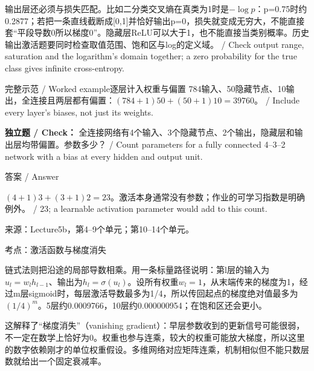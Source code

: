 输出层还必须与损失匹配。比如二分类交叉熵在真类为1时是\(-\log p\)：p=0.75时约0.2877；若把一条直线截断成[0,1]并恰好输出p=0，损失就变成无穷大，不能直接套“平段导数0所以梯度0”。隐藏层ReLU可以大于1，也不能直接当类别概率。历史输出激活题要同时检查取值范围、饱和区与log的定义域。 / Check output range, saturation and the logarithm's domain together; a zero probability for the true class gives infinite cross-entropy.


\begin{StudyBlock}{完整示范 / Worked example}{逐层计入权重与偏置}
784输入、50隐藏节点、10输出，全连接且两层都有偏置：\((784+1)50+(50+1)10=39760\)。 / Include every layer's biases, not just its weights.
\end{StudyBlock}


\textbf{独立题 / Check：} 全连接网络有4个输入、3个隐藏节点、2个输出，隐藏层和输出层均带偏置。参数多少？ / Count parameters for a fully connected 4–3–2 network with a bias at every hidden and output unit.



\begin{StudySolution}{答案 / Answer}


\((4+1)3+(3+1)2=23\)。激活本身通常没有参数；作业的可学习指数是明确例外。 / 23; a learnable activation parameter would add to this count.


\end{StudySolution}


来源：Lecture5b，第4–9个单元；第10–14个单元。








考点：激活函数与梯度消失
 

链式法则把沿途的局部导数相乘。用一条标量路径说明：第l层的输入为\(u_l=w_lh_{l-1}\)、输出为\(h_l=\sigma(u_l)\)。设所有权重\(w_l=1\)，从末端传来的梯度为1，经过m层sigmoid时，每层激活导数最多为1/4，所以传回起点的梯度绝对值最多为\((1/4)^m\)。5层约0.0009766，10层约0.000000954；在饱和区还会更小。


这解释了“梯度消失”（vanishing gradient）：早层参数收到的更新信号可能很弱，不一定在数学上恰好为0。权重也参与连乘，较大的权重可能放大梯度，所以这里的数字依赖刚才的单位权重假设。多维网络对应矩阵连乘，机制相似但不能只数层数就给出一个固定衰减率。


